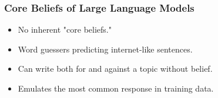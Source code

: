 


\begin{frame}[fragile]\frametitle{Core Beliefs of Large Language Models}
  \begin{itemize}
    \item No inherent "core beliefs."
    \item Word guessers predicting internet-like sentences.
    \item Can write both for and against a topic without belief.
    \item Emulates the most common response in training data.
  \end{itemize}
\end{frame}

